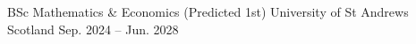 

\begin{cventries}

  \cventry
    {BSc Mathematics \& Economics (Predicted 1st)} %
    {University of St Andrews} %
    {Scotland} %
    {Sep. 2024 -- Jun. 2028} %
    {}

\end{cventries}
